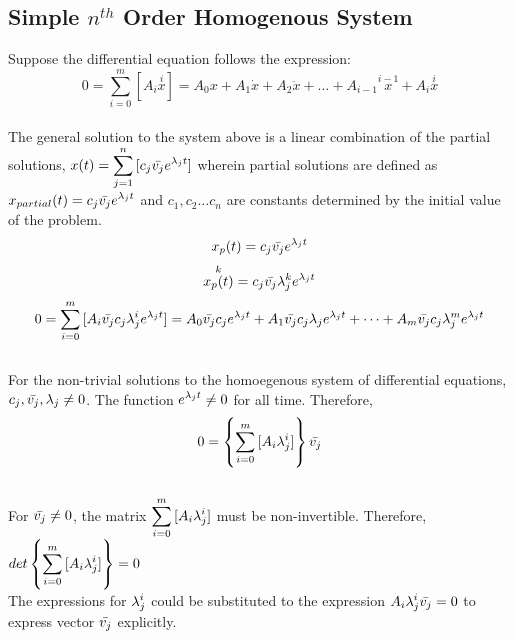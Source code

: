 \documentclass[class=report, 12pt, crop=false]{standalone}
\begin{document}
\begin{center}
\section{Simple $n^{th}$ Order Homogenous System}
\begin{comment}
\end{comment}
Suppose the differential equation follows the expression:
$$0 = \sum_{i = 0}^{m}{[A_i \overset{i}{x}]} = A_0 x + A_1 \dot{x} + A_2 \ddot{x}+ \dots + A_{i - 1} \overset{i -  1}{x} + A_{i} \overset{i}{x}$$
\\The general solution to the system above is a linear combination of the partial solutions, $\displaystyle{x(t) = \sum_{j = 1}^{n}{[c_j \bar{v_j}e^{\lambda_j t}]}}$ wherein partial solutions are defined as $\displaystyle{x_{partial}(t) = c_j \bar{v_j}e^{\lambda_j t}}$ and $c_1, c_2 \dots c_n$ are constants determined by the initial value of the problem. 
$$x_{p}(t) = c_j \bar{v_j}e^{\lambda_j t}$$
$$\overset{k}{x_{p}(t)} = c_j \bar{v_j}\lambda_{j}^k e^{\lambda_j t}$$
$$0 = \sum_{i = 0}^{m}{[A_i \bar{v_j} c_j \lambda_{j}^i e^{\lambda_j t}]} =A_0 \bar{v_j} c_j e^{\lambda_j t} + A_1 \bar{v_j} c_j \lambda_{j} e^{\lambda_j t} + \dots + A_m \bar{v_j} c_j \lambda_{j}^m e^{\lambda_j t}$$
\\For the non-trivial solutions to the homoegenous system of differential equations, $\displaystyle{c_j, \bar{v_j}, \lambda_j \neq 0}$. The function $\displaystyle{e^{\lambda_j t}}\neq 0$ for all time. Therefore, 
$$0 = \left\{ \sum_{i = 0}^{m}{[A_i \lambda_{j}^i]} \right\} \bar{v_j}$$
\\For $\displaystyle{\bar{v_j} \neq 0}$, the matrix $\displaystyle{\sum_{i = 0}^{m}{[A_i \lambda_{j}^i]}}$ must be non-invertible. Therefore, $\displaystyle{det\left\{ \sum_{i = 0}^{m}{[A_i \lambda_{j}^i]} \right\} = 0}$
\\The expressions for $\displaystyle{\lambda_j ^ i}$ could be substituted to the expression $\displaystyle{A_i \lambda_{j}^i} \bar{v_j} = 0$ to express vector $\displaystyle{\bar{v_j}}$ explicitly.






















\end{center}
\end{document}
